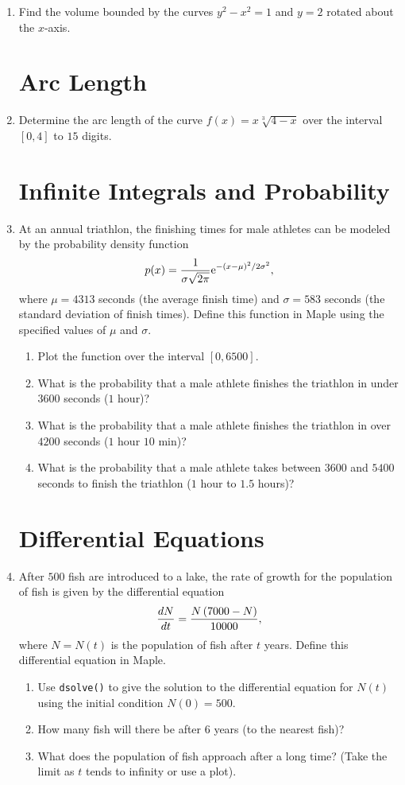 \begin{enumerate}
\item Find the volume bounded by the curves $y^2 - x^2 = 1$ and $y=2$ rotated about the $x$-axis.

\section*{Arc Length}

\item Determine the arc length of the curve $f(x) = x\sqrt[3]{4-x}$ over the interval $[0,4]$ to $15$ digits.

\section*{Infinite Integrals and Probability}

\item At an annual triathlon, the finishing times for male athletes can be modeled by the probability density function
\[ p(x) = \dfrac{1}{\sigma \sqrt{2\pi}} {\rm e}^{-(x-\mu)^2/2\sigma^2}, \]
where $\mu = 4313$ seconds (the average finish time) and $\sigma = 583$ seconds (the standard deviation of finish times). Define this function in Maple using the specified values of $\mu$ and $\sigma$.
	\begin{enumerate}
	\item Plot the function over the interval $[0,6500].$
	\item What is the probability that a male athlete finishes the triathlon in under $3600$ seconds ($1$ hour)?
	\item What is the probability that a male athlete finishes the triathlon in over $4200$ seconds ($1$ hour $10$ min)?
	\item What is the probability that a male athlete takes between $3600$ and $5400$ seconds to finish the triathlon ($1$ hour to $1.5$ hours)?
	\end{enumerate}
	
\section*{Differential Equations}

\item After $500$ fish are introduced to a lake, the rate of growth for the population of fish is given by the differential equation
\[ \frac{dN}{dt} = \dfrac{N\left(7000 - N\right)}{10000}, \]
where $N=N(t)$ is the population of fish after $t$ years. Define this differential equation in Maple.
	\begin{enumerate}
	\item Use \texttt{dsolve()} to give the solution to the differential equation for $N(t)$ using the initial condition $N(0)=500$.
	\item How many fish will there be after $6$ years (to the nearest fish)?
	\item What does the population of fish approach after a long time? (Take the limit as $t$ tends to infinity or use a plot).
	\end{enumerate}


\end{enumerate}
